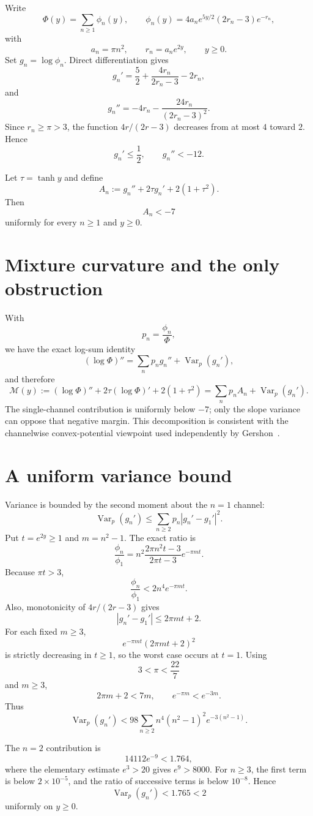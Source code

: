 Write
\[
\Phi(y)=\sum_{n\ge1}\phi_n(y),
\qquad
\phi_n(y)=4a_n e^{5y/2}(2r_n-3)e^{-r_n},
\]
with
\[
a_n=\pi n^2,
\qquad
r_n=a_n e^{2y},
\qquad
y\ge0.
\]
Set \(g_n=\log\phi_n\). Direct differentiation gives
\[
g_n'=\frac52+\frac{4r_n}{2r_n-3}-2r_n,
\]
and
\[
g_n''=-4r_n-\frac{24r_n}{(2r_n-3)^2}.
\]
Since \(r_n\ge\pi>3\), the function \(4r/(2r-3)\) decreases from at most \(4\) toward \(2\). Hence
\[
g_n'\le\frac12,
\qquad
g_n''<-12.
\]

Let \(\tau=\tanh y\) and define
\[
A_n:=g_n''+2\tau g_n'+2(1+\tau^2).
\]
Then
\[
\boxed{A_n<-7}
\]
uniformly for every \(n\ge1\) and \(y\ge0\).

\section{Mixture curvature and the only obstruction}

With
\[
p_n=\frac{\phi_n}{\Phi},
\]
we have the exact log-sum identity
\[
(\log\Phi)''
=\sum_n p_n g_n''+\operatorname{Var}_p(g_n'),
\]
and therefore
\[
\mathcal M(y):=(\log\Phi)''+2\tau(\log\Phi)'+2(1+\tau^2)
=\sum_n p_nA_n+\operatorname{Var}_p(g_n').
\]
The single-channel contribution is uniformly below \(-7\); only the slope variance can oppose that negative margin. This decomposition is consistent with the channelwise convex-potential viewpoint used independently by Gershon~\cite{gershon2026logconcavity}.

\section{A uniform variance bound}

Variance is bounded by the second moment about the \(n=1\) channel:
\[
\operatorname{Var}_p(g_n')
\le\sum_{n\ge2}p_n|g_n'-g_1'|^2.
\]
Put \(t=e^{2y}\ge1\) and \(m=n^2-1\). The exact ratio is
\[
\frac{\phi_n}{\phi_1}
=n^2\frac{2\pi n^2t-3}{2\pi t-3}e^{-\pi mt}.
\]
Because \(\pi t>3\),
\[
\frac{\phi_n}{\phi_1}<2n^4e^{-\pi mt}.
\]
Also, monotonicity of \(4r/(2r-3)\) gives
\[
|g_n'-g_1'|\le2\pi mt+2.
\]
For each fixed \(m\ge3\),
\[
e^{-\pi mt}(2\pi mt+2)^2
\]
is strictly decreasing in \(t\ge1\), so the worst case occurs at \(t=1\). Using
\[
3<\pi<\frac{22}{7}
\]
and \(m\ge3\),
\[
2\pi m+2<7m,
\qquad
e^{-\pi m}<e^{-3m}.
\]
Thus
\[
\operatorname{Var}_p(g_n')
<98\sum_{n\ge2}n^4(n^2-1)^2e^{-3(n^2-1)}.
\]

The \(n=2\) contribution is
\[
14112e^{-9}<1.764,
\]
where the elementary estimate \(e^3>20\) gives \(e^9>8000\). For \(n\ge3\), the first term is below \(2\times10^{-5}\), and the ratio of successive terms is below \(10^{-8}\). Hence
\[
\boxed{\operatorname{Var}_p(g_n')<1.765<2}
\]
uniformly on \(y\ge0\).

